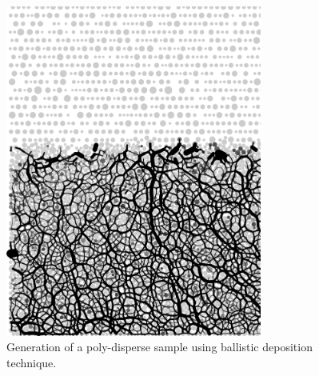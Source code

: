 \begin{figure}
	\centering
	\includegraphics[width=0.75\textwidth]{ini_sample}
	\caption{Generation of a poly-disperse sample using ballistic deposition 
	technique.}
	\label{fig:ini_sample}
\end{figure}
%

